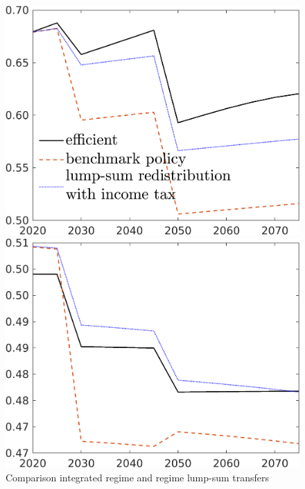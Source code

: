 \begin{figure}[h!!]
	\centering
	\caption{Comparison integrated regime and regime lump-sum transfers}\label{fig:bench_lumpsum}
	
	\begin{minipage}[]{0.32\textwidth}
		\includegraphics[width=1\textwidth]{../../codding_model/own_basedOnFried/optimalPol_190722_tidiedUp/figures/all_July22/C_CompEffOPT_T_NoTaus_bb3_pol4_spillover0_noskill0_sep1_xgrowth0_etaa0.79_lgd1_lff0.png}
	\end{minipage}
	\begin{minipage}[]{0.32\textwidth}
		\includegraphics[width=1\textwidth]{../../codding_model/own_basedOnFried/optimalPol_190722_tidiedUp/figures/all_July22/hh_CompEffOPT_T_NoTaus_bb3_pol4_spillover0_noskill0_sep1_xgrowth0_etaa0.79_lgd0_lff0.png}

\end{minipage}
\end{figure}
